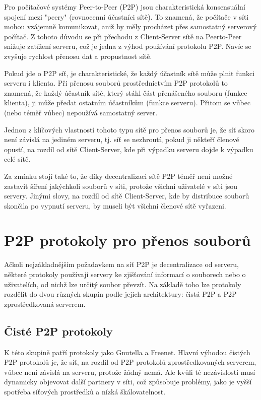 \documentclass[10pt,twoside,czech,a4paper]{article}
\begin{document}
Pro počítačové systémy Peer-to-Peer (P2P) jsou charakteristická konsensuální spojení mezi "peery" (rovnocenní účastníci sítě).
To znamená, že počítače v síti mohou vzájemně komunikovat, aniž by měly procházet přes samostatný serverový počítač\cite{Bauwens2019}.
Z tohoto důvodu se při přechodu z Client-Server sítě na Peerto-Peer snižuje zatížení serveru, což je jedna z výhod používání protokolu P2P.
Navíc se zvyšuje rychlost přenosu dat a propustnost sítě.

Pokud jde o P2P síť, je charakteristické, že každý účastník sítě může plnit funkci serveru i klienta.
Při přenosu souborů prostřednictvím P2P protokolů to znamená, že každý účastník sítě, který stáhl část přenášeného souboru (funkce klienta), ji může předat ostatním účastníkům (funkce serveru).
Přitom se vůbec (nebo téměř vůbec) nepoužívá samostatný server.

Jednou z klíčových vlastností tohoto typu sítě pro přenos souborů je, že síť skoro není závislá na jediném serveru, tj. síť se nezhroutí, pokud ji někteří členové opustí, na rozdíl od sítě Client-Server, kde při výpadku serveru dojde k výpadku celé sítě.

Za zmínku stojí také to, že díky decentralizaci sítě P2P téměř není možné zastavit šíření jakýchkoli souborů v síti, protože všichni uživatelé v síti jsou servery.
Jinými slovy, na rozdíl od sítě Client-Server, kde by distribuce souborů skončila po vypnutí serveru, by museli být všichni členové sítě vyřazeni.


\section{P2P protokoly pro přenos souborů}

Ačkoli nejzákladnějším požadavkem na síť P2P je decentralizace od serveru, některé protokoly používají servery ke zjišťování informací o souborech nebo o uživatelích, od nichž lze určitý soubor převzít.
Na základě toho lze protokoly rozdělit do dvou různých skupin podle jejich architektury: čistá P2P a P2P zprostředkovaná serverem\cite{Lui2002}.

\subsection{Čisté P2P protokoly}

K této skupině patří protokoly jako Gnutella a Freenet.
Hlavní výhodou čistých P2P protokolů je, že síť, na rozdíl od P2P protokolů zprostředkovaných serverem, vůbec není závislá na serveru, protože žádný nemá.
Ale kvůli té nezávislosti musí dynamicky objevovat další partnery v síti, což způsobuje problémy, jako je vyšší spotřeba síťových prostředků a nízká škálovatelnost\cite{Lui2002}.
\end{document}
